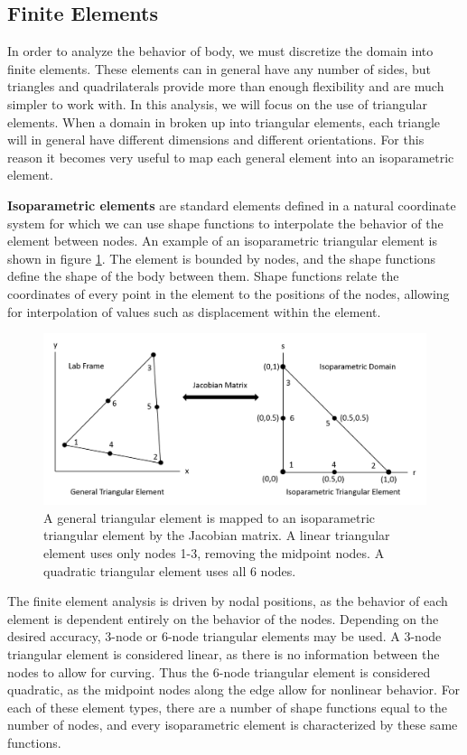 \documentclass[]{spie}  %
\begin{document}
\subsection{Finite Elements}
\label{sec: finite elements}
In order to analyze the behavior of body, we must discretize the domain into finite elements. These elements can in general have any number of sides, but triangles and quadrilaterals provide more than enough flexibility and are much simpler to work with. In this analysis, we will focus on the use of triangular elements. When a domain in broken up into triangular elements, each triangle will in general have different dimensions and different orientations. For this reason it becomes very useful to map each general element into an isoparametric element.

\textbf{Isoparametric elements} are standard elements defined in a natural coordinate system for which we can use shape functions to interpolate the behavior of the element between nodes. An example of an isoparametric triangular element is shown in figure \ref{fig: isoparametric triangular element}. The element is bounded by nodes, and the shape functions define the shape of the body between them. Shape functions relate the coordinates of every point in the element to the positions of the nodes, allowing for interpolation of values such as displacement within the element.

\begin{figure}[h]
	\centering
	\includegraphics[width=7in]{isoparametric_triangular_element.png}
	\caption{A general triangular element is mapped to an isoparametric triangular element by the Jacobian matrix. A linear triangular element uses only nodes 1-3, removing the midpoint nodes. A quadratic triangular element uses all 6 nodes.} 
	\label{fig: isoparametric triangular element}
\end{figure}

The finite element analysis is driven by nodal positions, as the behavior of each element is dependent entirely on the behavior of the nodes. Depending on the desired accuracy, 3-node or 6-node triangular elements may be used. A 3-node triangular element is considered linear, as there is no information between the nodes to allow for curving. Thus the 6-node triangular element is considered quadratic, as the midpoint nodes along the edge allow for nonlinear behavior. For each of these element types, there are a number of shape functions equal to the number of nodes, and every isoparametric element is characterized by these same functions.
\end{document}
